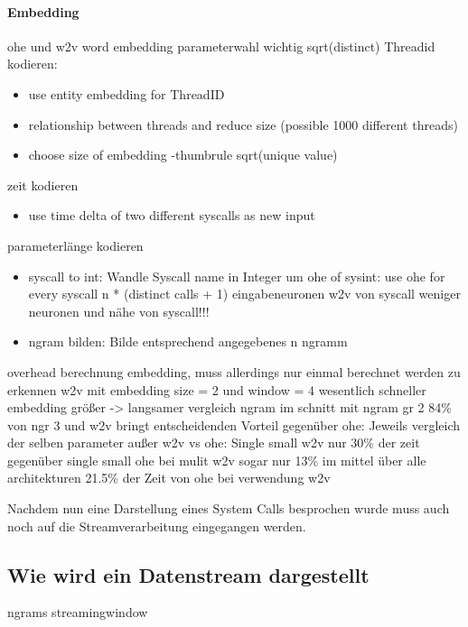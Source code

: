         \paragraph{Embedding}
            ohe und w2v
            word embedding parameterwahl wichtig sqrt(distinct)
            Threadid kodieren: 
            \begin{itemize}
                \item use entity embedding for ThreadID \cite{GUO2016} 
                \item relationship between threads and reduce size (possible 1000 different threads)
                \item choose size of embedding -thumbrule sqrt(unique value) 
            \end{itemize}
            zeit kodieren
            \begin{itemize}
                \item use time delta of two different syscalls as new input
            \end{itemize}
            parameterlänge kodieren
            \begin{itemize}
                \item syscall to int: Wandle Syscall name in Integer um
                \subitem ohe of sysint: use ohe for every syscall 
                 n * (distinct calls + 1) eingabeneuronen 
                \subitem w2v von syscall
                 weniger neuronen und nähe von syscall!!!
                \item ngram bilden: Bilde entsprechend angegebenes n ngramm
            \end{itemize}
            overhead berechnung embedding, muss allerdings nur einmal berechnet werden
            zu erkennen w2v mit embedding size = 2  und window = 4 wesentlich schneller
            embedding größer -> langsamer
            vergleich ngram
            im schnitt mit ngram gr 2 84\% von ngr 3 und 
            w2v bringt entscheidenden Vorteil gegenüber ohe:
            Jeweils vergleich der selben parameter außer w2v vs ohe:
            Single small w2v nur 30\% der zeit gegenüber single small ohe
            bei mulit w2v sogar nur 13\%
            im mittel über alle architekturen 21.5\% der Zeit von ohe bei verwendung w2v

        Nachdem nun eine Darstellung eines System Calls besprochen wurde muss auch noch auf die Streamverarbeitung eingegangen werden.

    \subsection{Wie wird ein Datenstream dargestellt}
        ngrams
        streamingwindow

